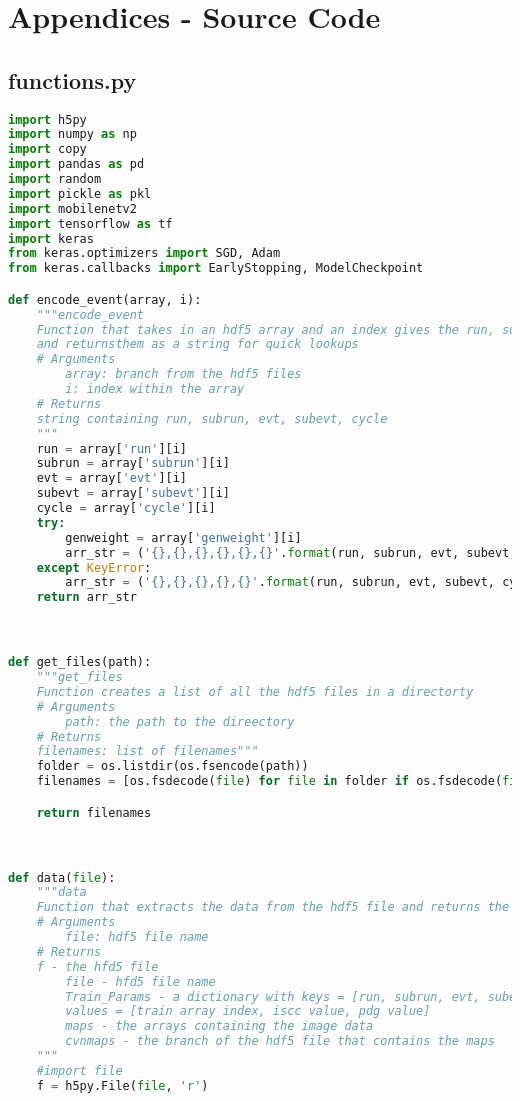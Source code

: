 
\onehalfspacing
\newpage
\chapter*{Appendices - Source Code}

\section*{functions.py}

\begin{lstlisting}[language=Python]
import h5py
import numpy as np
import copy
import pandas as pd
import random
import pickle as pkl
import mobilenetv2
import tensorflow as tf
import keras
from keras.optimizers import SGD, Adam
from keras.callbacks import EarlyStopping, ModelCheckpoint

def encode_event(array, i):
    """encode_event
    Function that takes in an hdf5 array and an index gives the run, subrun, evt, subevt, cycle of an event
    and returnsthem as a string for quick lookups
    # Arguments
        array: branch from the hdf5 files
        i: index within the array
    # Returns
	string containing run, subrun, evt, subevt, cycle
    """
    run = array['run'][i]
    subrun = array['subrun'][i]
    evt = array['evt'][i]
    subevt = array['subevt'][i]
    cycle = array['cycle'][i]
    try:
        genweight = array['genweight'][i]
        arr_str = ('{},{},{},{},{},{}'.format(run, subrun, evt, subevt, cycle, genweight))
    except KeyError:
        arr_str = ('{},{},{},{},{}'.format(run, subrun, evt, subevt, cycle))
    return arr_str



def get_files(path):
    """get_files
    Function creates a list of all the hdf5 files in a directorty
    # Arguments
        path: the path to the direectory
    # Returns
	filenames: list of filenames"""
    folder = os.listdir(os.fsencode(path))
    filenames = [os.fsdecode(file) for file in folder if os.fsdecode(file).endswith(('.h5'))]

    return filenames



def data(file):
    """data
    Function that extracts the data from the hdf5 file and returns the relevant data
    # Arguments
        file: hdf5 file name
    # Returns
	f - the hfd5 file
        file - hfd5 file name
        Train_Params - a dictionary with keys = [run, subrun, evt, subevt, cycle] and
        values = [train array index, iscc value, pdg value]
        maps - the arrays containing the image data
        cvnmaps - the branch of the hdf5 file that contains the maps
    """
    #import file
    f = h5py.File(file, 'r')


\end{lstlisting}
